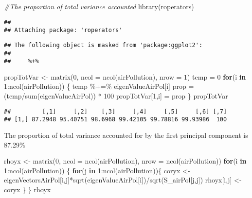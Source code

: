 \documentclass[
]{article}
\newenvironment{Shaded}{\begin{snugshade}}{\end{snugshade}}
\newcommand{\AttributeTok}[1]{\textcolor[rgb]{0.77,0.63,0.00}{#1}}
\newcommand{\CommentTok}[1]{\textcolor[rgb]{0.56,0.35,0.01}{\textit{#1}}}
\newcommand{\ControlFlowTok}[1]{\textcolor[rgb]{0.13,0.29,0.53}{\textbf{#1}}}
\newcommand{\DecValTok}[1]{\textcolor[rgb]{0.00,0.00,0.81}{#1}}
\newcommand{\FunctionTok}[1]{\textcolor[rgb]{0.00,0.00,0.00}{#1}}
\newcommand{\NormalTok}[1]{#1}
\newcommand{\OtherTok}[1]{\textcolor[rgb]{0.56,0.35,0.01}{#1}}
\newcommand{\SpecialCharTok}[1]{\textcolor[rgb]{0.00,0.00,0.00}{#1}}
\begin{document}
\begin{Shaded}
\begin{Highlighting}[]
\CommentTok{\#The proportion of total variance accounted}
\FunctionTok{library}\NormalTok{(roperators)}
\end{Highlighting}
\end{Shaded}

\begin{verbatim}
## 
## Attaching package: 'roperators'
\end{verbatim}

\begin{verbatim}
## The following object is masked from 'package:ggplot2':
## 
##     %+%
\end{verbatim}

\begin{Shaded}
\begin{Highlighting}[]
\NormalTok{propTotVar }\OtherTok{\textless{}{-}} \FunctionTok{matrix}\NormalTok{(}\DecValTok{0}\NormalTok{, }\AttributeTok{ncol =} \FunctionTok{ncol}\NormalTok{(airPollution), }\AttributeTok{nrow =} \DecValTok{1}\NormalTok{)}
\NormalTok{temp }\OtherTok{=} \DecValTok{0}
\ControlFlowTok{for}\NormalTok{(i }\ControlFlowTok{in} \DecValTok{1}\SpecialCharTok{:}\FunctionTok{ncol}\NormalTok{(airPollution))}
\NormalTok{\{}
\NormalTok{  temp }\SpecialCharTok{\%+=\%}\NormalTok{ eigenValueAirPol[i]}
\NormalTok{  prop }\OtherTok{=}\NormalTok{ (temp}\SpecialCharTok{/}\FunctionTok{sum}\NormalTok{(eigenValueAirPol)) }\SpecialCharTok{*} \DecValTok{100}
\NormalTok{  propTotVar[}\DecValTok{1}\NormalTok{,i] }\OtherTok{=}\NormalTok{ prop}
\NormalTok{\}}
\NormalTok{propTotVar}
\end{Highlighting}
\end{Shaded}

\begin{verbatim}
##         [,1]     [,2]    [,3]     [,4]     [,5]     [,6] [,7]
## [1,] 87.2948 95.40751 98.6968 99.42105 99.78816 99.93986  100
\end{verbatim}

The proportion of total variance accounted for by the first principal
component is 87.29\%

\begin{Shaded}
\begin{Highlighting}[]
\NormalTok{rhoyx }\OtherTok{\textless{}{-}} \FunctionTok{matrix}\NormalTok{(}\DecValTok{0}\NormalTok{, }\AttributeTok{ncol =} \FunctionTok{ncol}\NormalTok{(airPollution), }\AttributeTok{nrow =} \FunctionTok{ncol}\NormalTok{(airPollution))}
\ControlFlowTok{for}\NormalTok{(i }\ControlFlowTok{in} \DecValTok{1}\SpecialCharTok{:}\FunctionTok{ncol}\NormalTok{(airPollution))}
\NormalTok{\{}
  \ControlFlowTok{for}\NormalTok{(j }\ControlFlowTok{in} \DecValTok{1}\SpecialCharTok{:}\FunctionTok{ncol}\NormalTok{(airPollution))\{}
\NormalTok{   coryx }\OtherTok{\textless{}{-}}\NormalTok{ eigenVectorsAirPol[i,j]}\SpecialCharTok{*}\FunctionTok{sqrt}\NormalTok{(eigenValueAirPol[i])}\SpecialCharTok{/}\FunctionTok{sqrt}\NormalTok{(S\_airPol[j,j])  }
\NormalTok{   rhoyx[i,j] }\OtherTok{\textless{}{-}}\NormalTok{coryx}
\NormalTok{  \}}
\NormalTok{\}}
\NormalTok{rhoyx}
\end{Highlighting}
\end{Shaded}
\end{document}
